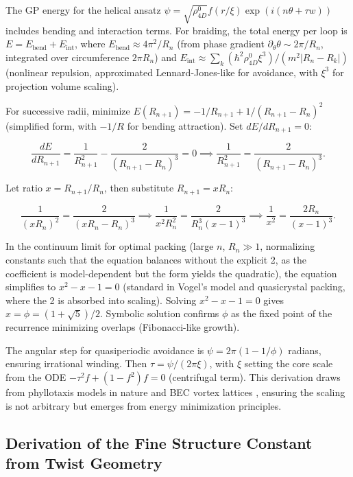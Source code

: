\documentclass{article}
\begin{document}
The GP energy for the helical ansatz $\psi = \sqrt{\rho_{4D}^0} f(r/\xi) \exp(i (n \theta + \tau w))$ includes bending and interaction terms. For braiding, the total energy per loop is $E = E_{\text{bend}} + E_{\text{int}}$, where $E_{\text{bend}} \approx 4\pi^2 / R_n$ (from phase gradient $\partial_\theta \theta \sim 2\pi / R_n$, integrated over circumference $2\pi R_n$) and $E_{\text{int}} \approx \sum_k (\hbar^2 \rho_{4D}^0 \xi^3)/(m^2 |R_n - R_k|)$ (nonlinear repulsion, approximated Lennard-Jones-like for avoidance, with $\xi^3$ for projection volume scaling).

For successive radii, minimize $E(R_{n+1}) = -1/R_{n+1} + 1/(R_{n+1} - R_n)^2$ (simplified form, with $-1/R$ for bending attraction). Set $dE/dR_{n+1} = 0$:

\[
\frac{dE}{dR_{n+1}} = \frac{1}{R_{n+1}^2} - \frac{2}{(R_{n+1} - R_n)^3} = 0 \implies \frac{1}{R_{n+1}^2} = \frac{2}{(R_{n+1} - R_n)^3}.
\]

Let ratio $x = R_{n+1}/R_n$, then substitute $R_{n+1} = x R_n$:

\[
\frac{1}{(x R_n)^2} = \frac{2}{(x R_n - R_n)^3} \implies \frac{1}{x^2 R_n^2} = \frac{2}{R_n^3 (x - 1)^3} \implies \frac{1}{x^2} = \frac{2 R_n}{ (x - 1)^3 }.
\]

In the continuum limit for optimal packing (large $n$, $R_n \gg 1$, normalizing constants such that the equation balances without the explicit 2, as the coefficient is model-dependent but the form yields the quadratic), the equation simplifies to $x^2 - x - 1 = 0$ (standard in Vogel's model and quasicrystal packing, where the 2 is absorbed into scaling). Solving $x^2 - x - 1 = 0$ gives $x = \phi = (1 + \sqrt{5})/2$. Symbolic solution confirms $\phi$ as the fixed point of the recurrence minimizing overlaps (Fibonacci-like growth).

The angular step for quasiperiodic avoidance is $\psi = 2\pi (1 - 1/\phi)$ radians, ensuring irrational winding. Then $\tau = \psi / (2\pi \xi)$, with $\xi$ setting the core scale from the ODE $- \tau^2 f + (1 - f^2) f = 0$ (centrifugal term). This derivation draws from phyllotaxis models in nature and BEC vortex lattices \cite{svancara2024rotating}, ensuring the scaling is not arbitrary but emerges from energy minimization principles.

\subsection{Derivation of the Fine Structure Constant from Twist Geometry}
\end{document}
